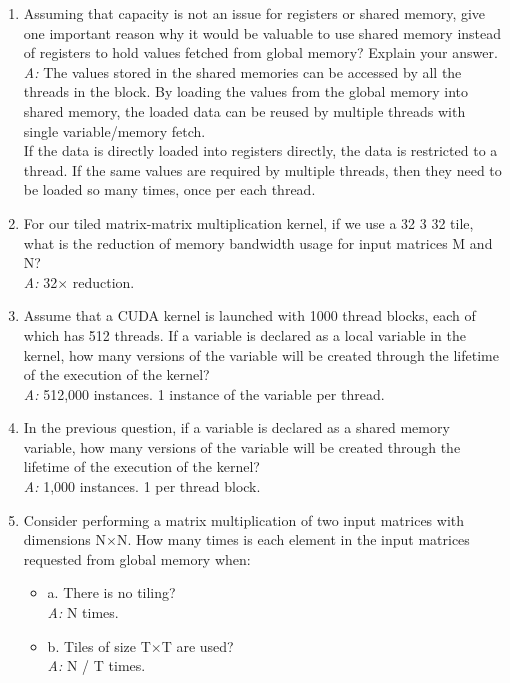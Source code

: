 \begin{enumerate}
    \item Assuming that capacity is not an issue for registers or shared memory, give one important reason why it would be valuable to use shared memory instead of registers to hold values fetched from global memory? Explain your answer.
          \\\textsl{A:} The values stored in the shared memories can be accessed by all the threads in the block. By loading the values from the global memory into shared memory, the loaded data can be reused by multiple threads with single variable/memory fetch.\\ If the data is directly loaded into registers directly, the data is restricted to a thread. If the same values are required by multiple threads, then they need to be loaded so many times, once per each thread.

    \item For our tiled matrix-matrix multiplication kernel, if we use a 32 3 32 tile, what is the reduction of memory bandwidth usage for input matrices M and N?
          \\\textsl{A:} 32$\times$ reduction.
    \item Assume that a CUDA kernel is launched with 1000 thread blocks, each of which has 512 threads. If a variable is declared as a local variable in the kernel, how many versions of the variable will be created through the lifetime of the execution of the kernel?
          \\\textsl{A:} 512,000 instances. 1 instance of the variable per thread.
    \item In the previous question, if a variable is declared as a shared memory variable, how many versions of the variable will be created through the lifetime of the execution of the kernel?
          \\\textsl{A:} 1,000 instances. 1 per thread block.
    \item Consider performing a matrix multiplication of two input matrices with dimensions N$\times$N. How many times is each element in the input matrices requested from global memory when:
          \begin{itemize}
              \item a. There is no tiling?
                    \\ \textsl{A:} N times.
              \item b. Tiles of size T$\times$T are used?
                    \\ \textsl{A: } N / T times.
          \end{itemize}


\end{enumerate}
